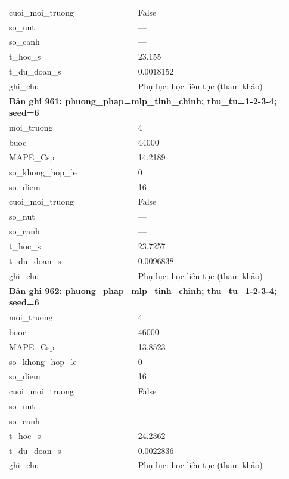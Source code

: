 \begin{longtable}{p{0.43\linewidth}p{0.50\linewidth}}
cuoi\_\allowbreak moi\_\allowbreak truong & False \\
so\_\allowbreak nut & — \\
so\_\allowbreak canh & — \\
t\_\allowbreak hoc\_\allowbreak s & 23.155 \\
t\_\allowbreak du\_\allowbreak doan\_\allowbreak s & 0.0018152 \\
ghi\_\allowbreak chu & Phụ lục: học liên tục (tham khảo) \\
\midrule
\multicolumn{2}{p{0.95\linewidth}}{\textbf{Bản ghi 961: phuong\_phap=mlp\_tinh\_chinh; thu\_tu=1-2-3-4; seed=6}} \\
moi\_\allowbreak truong & 4 \\
buoc & 44000 \\
MAPE\_\allowbreak Csp & 14.2189 \\
so\_\allowbreak khong\_\allowbreak hop\_\allowbreak le & 0 \\
so\_\allowbreak diem & 16 \\
cuoi\_\allowbreak moi\_\allowbreak truong & False \\
so\_\allowbreak nut & — \\
so\_\allowbreak canh & — \\
t\_\allowbreak hoc\_\allowbreak s & 23.7257 \\
t\_\allowbreak du\_\allowbreak doan\_\allowbreak s & 0.0096838 \\
ghi\_\allowbreak chu & Phụ lục: học liên tục (tham khảo) \\
\midrule
\multicolumn{2}{p{0.95\linewidth}}{\textbf{Bản ghi 962: phuong\_phap=mlp\_tinh\_chinh; thu\_tu=1-2-3-4; seed=6}} \\
moi\_\allowbreak truong & 4 \\
buoc & 46000 \\
MAPE\_\allowbreak Csp & 13.8523 \\
so\_\allowbreak khong\_\allowbreak hop\_\allowbreak le & 0 \\
so\_\allowbreak diem & 16 \\
cuoi\_\allowbreak moi\_\allowbreak truong & False \\
so\_\allowbreak nut & — \\
so\_\allowbreak canh & — \\
t\_\allowbreak hoc\_\allowbreak s & 24.2362 \\
t\_\allowbreak du\_\allowbreak doan\_\allowbreak s & 0.0022836 \\
ghi\_\allowbreak chu & Phụ lục: học liên tục (tham khảo) \\

\end{longtable}
